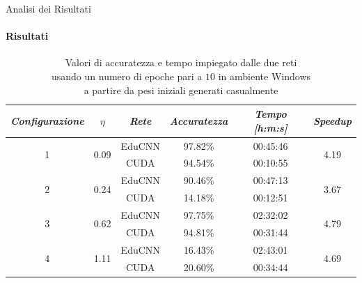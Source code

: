 \documentclass[
 ]{beamer}
\begin{document}
\begin{frame}{Analisi dei Risultati}
    \framesubtitle{Risultati}

        \begin{table}
            \centering
            \renewcommand\arraystretch{1.3}
            \small
            \begin{tabular}{| c | c | c | c | c | c |}
                \hline
                \emph{Configurazione} & $\eta$ & \emph{Rete} & \emph{Accuratezza} & \emph{Tempo [h:m:s]} & \emph{Speedup} \\
                \hline
                \multirow{2}{*}{1} & \multirow{2}{*}{0.09} & EduCNN & 97.82\% & 00:45:46 & \multirow{2}{*}{4.19} \\ \cline{3-5} 
                                   &                       & CUDA   & 94.54\% & 00:10:55  & \\
                \hline
                \multirow{2}{*}{2} & \multirow{2}{*}{0.24} & EduCNN & 90.46\% & 00:47:13 & \multirow{2}{*}{3.67} \\ \cline{3-5} 
                                   &                       & CUDA   & 14.18\% & 00:12:51 & \\
                \hline
                \multirow{2}{*}{3} & \multirow{2}{*}{0.62} & EduCNN & 97.75\% & 02:32:02 & \multirow{2}{*}{4.79} \\ \cline{3-5} 
                                   &                       & CUDA   & 94.81\% & 00:31:44 & \\
                \hline
                \multirow{2}{*}{4} & \multirow{2}{*}{1.11} & EduCNN & 16.43\% & 02:43:01 & \multirow{2}{*}{4.69} \\ \cline{3-5} 
                                   &                       & CUDA   & 20.60\% & 00:34:44 & \\
                \hline
            \end{tabular}
            \caption            
    {Valori di accuratezza e tempo impiegato dalle due reti \\ usando un numero di epoche pari a $10$ in ambiente Windows \\ a partire da pesi iniziali generati casualmente \endtabular}          
        \end{table}    
\end{frame}

\end{document}
